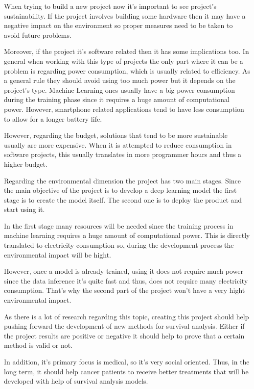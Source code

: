 When trying to build a new project now it's important to see project's sustainability. If the
project involves building some hardware then it may have a negative impact on the environment
so proper measures need to be taken to avoid future problems.

Moreover, if the project it's software related then it has some implications too. In general
when working with this type of projects the only part where it can be a problem is regarding
power consumption, which is usually related to efficiency. As a general rule they should
avoid using too much power but it depends on the project's type. Machine Learning ones
usually have a big power consumption during the training phase since it requires a huge
amount of computational power. However, smartphone related applications tend to have less
consumption to allow for a longer battery life.

However, regarding the budget, solutions that tend to be more sustainable usually are more
expensive. When it is attempted to reduce consumption in software projects, this usually 
translates in more programmer hours and thus a higher budget.


Regarding the environmental dimension the project has two main stages. Since the main objective
of the project is to develop a deep learning model the first stage is to create the model
itself. The second one is to deploy the product and start using it.

In the first stage many resources will be needed since the training process in machine learning
requires a huge amount of computational power. This is directly translated to electricity 
consumption so, during the development process the environmental impact will be hight.

However, once a model is already trained, using it does not require much power since the
data inference it's quite fast and thus, does not require many electricity consumption.
That's why the second part of the project won't have a very hight environmental impact.


As there is a lot of research regarding this topic, creating this project should help pushing 
forward the development of new methods for survival analysis. Either if the project results 
are positive or negative it should help to prove that a certain method is valid or not. 

In addition, it's primary focus is medical, so it's very social oriented. Thus,
in the long term, it should help cancer patients to receive better treatments 
that will be developed with help of survival analysis models. 

